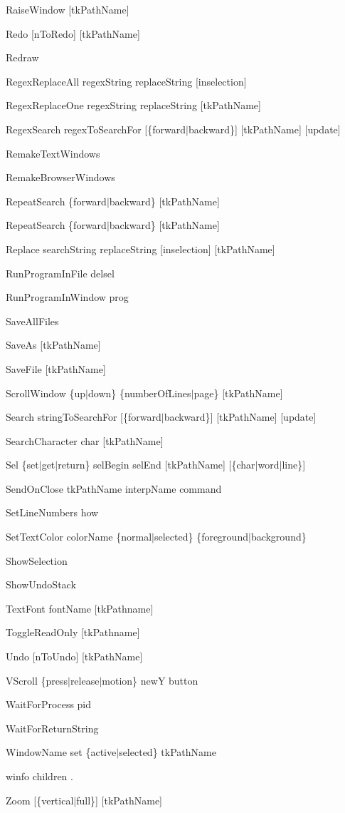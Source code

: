 \begin{description}
\item {RaiseWindow [tkPathName]}
\item {Redo [nToRedo] [tkPathName]}
\item {Redraw}
\item {RegexReplaceAll regexString replaceString [inselection]}
\item {RegexReplaceOne regexString replaceString [tkPathName]}
\item {RegexSearch regexToSearchFor [\{forward$\mid$backward\}] [tkPathName] [update]}
\item {RemakeTextWindows}
\item {RemakeBrowserWindows}
\item {RepeatSearch \{forward$\mid$backward\} [tkPathName]}
\item {RepeatSearch \{forward$\mid$backward\} [tkPathName]}
\item {Replace searchString replaceString [inselection] [tkPathName]}
\item {RunProgramInFile delsel}
\item {RunProgramInWindow prog}
\item {SaveAllFiles}
\item {SaveAs [tkPathName]}
\item {SaveFile [tkPathName]}
\item {ScrollWindow \{up$\mid$down\} \{numberOfLines$\mid$page\} [tkPathName]}
\item {Search stringToSearchFor [\{forward$\mid$backward\}] [tkPathName] [update]}
\item {SearchCharacter char [tkPathName]}
\item {Sel \{set$\mid$get$\mid$return\} selBegin selEnd [tkPathName] [\{char$\mid$word$\mid$line\}]}
\item {SendOnClose tkPathName interpName command}
\item {SetLineNumbers how}
\item {SetTextColor colorName \{normal$\mid$selected\} \{foreground$\mid$background\} }
\item {ShowSelection}
\item {ShowUndoStack}
\item {TextFont fontName [tkPathname]}
\item {ToggleReadOnly [tkPathname]}
\item {Undo [nToUndo] [tkPathName]}
\item {VScroll \{press$\mid$release$\mid$motion\} newY button}
\item {WaitForProcess pid}
\item {WaitForReturnString}
\item {WindowName set \{active$\mid$selected\} tkPathName}
\item {winfo children .}
\item {Zoom [\{vertical$\mid$full\}] [tkPathName]}

\end{description}


